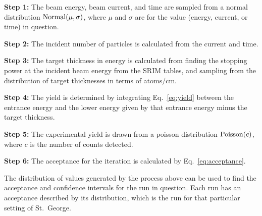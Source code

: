\textbf{Step 1:}
  The beam energy, beam current, and time are sampled from a normal
  distribution ${\rm Normal}(\mu,\sigma)$, where $\mu$ and $\sigma$ are
  for the value (energy, current, or time) in question.

\textbf{Step 2:}
  The incident number of particles is calculated from the current and
  time.

\textbf{Step 3:}
  The target thickness in energy is calculated from finding the stopping
  power at the incident beam energy from the SRIM tables, and sampling
  from the distribution of target thicknesses in terms of
  atoms/cm\squared{}.

\textbf{Step 4:}
  The yield is determined by integrating Eq.~\ref{eq:yield} between the
  entrance energy and the lower energy given by that entrance energy
  minus the target thickness.

\textbf{Step 5:}
  The experimental yield is drawn from a poisson distribution
  ${\rm Poisson}(c)$, where $c$ is the number of counts detected.

\textbf{Step 6:}
  The acceptance for the iteration is calculated by
  Eq.~\ref{eq:acceptance}.

The distribution of values generated by the process above can be used to
find the acceptance and confidence intervals for the run in question.
Each run has an acceptance described by its distribution, which is the
run for that particular setting of St.\ George.
